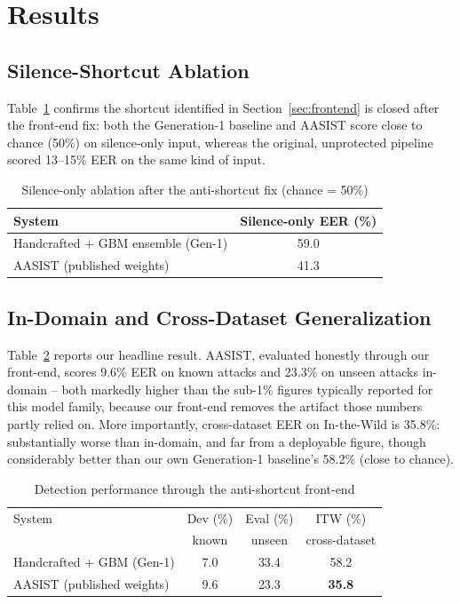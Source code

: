 \documentclass[conference]{IEEEtran}
\begin{document}
\section{Results}
\label{sec:results}

\subsection{Silence-Shortcut Ablation}
Table~\ref{tab:silence} confirms the shortcut identified in
Section~\ref{sec:frontend} is closed after the front-end fix: both the
Generation-1 baseline and AASIST score close to chance (50\%) on
silence-only input, whereas the original, unprotected pipeline scored
13--15\% EER on the same kind of input.

\begin{table}[t]
\centering
\caption{Silence-only ablation after the anti-shortcut fix (chance = 50\%)}
\label{tab:silence}
\begin{tabular}{@{}lc@{}}
\toprule
System & Silence-only EER (\%) \\
\midrule
Handcrafted + GBM ensemble (Gen-1) & 59.0 \\
AASIST (published weights)         & 41.3 \\
\bottomrule
\end{tabular}
\end{table}

\subsection{In-Domain and Cross-Dataset Generalization}
Table~\ref{tab:main} reports our headline result. AASIST, evaluated
honestly through our front-end, scores 9.6\% EER on known attacks and
23.3\% on unseen attacks in-domain -- both markedly higher than the
sub-1\% figures typically reported for this model family, because our
front-end removes the artifact those numbers partly relied on. More
importantly, cross-dataset EER on In-the-Wild is 35.8\%: substantially
worse than in-domain, and far from a deployable figure, though
considerably better than our own Generation-1 baseline's 58.2\% (close
to chance).

\begin{table}[t]
\centering
\caption{Detection performance through the anti-shortcut front-end}
\label{tab:main}
\begin{tabular}{@{}lccc@{}}
\toprule
System & Dev (\%) & Eval (\%) & ITW (\%) \\
 & known & unseen & cross-dataset \\
\midrule
Handcrafted + GBM (Gen-1) & 7.0 & 33.4 & 58.2 \\
AASIST (published weights) & 9.6 & 23.3 & \textbf{35.8} \\
\bottomrule
\end{tabular}
\end{table}
\end{document}
